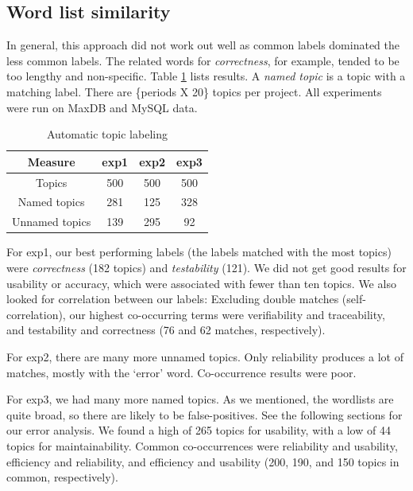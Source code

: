 \documentclass{acm_proc_article-sp}
\newcommand{\XXX}[1]{\textcolor{red}{{\it \textbf{[XXX: #1]}}}}
\begin{document}
\subsection{Word list similarity}


In general, this approach did not work out well as common labels dominated the less common labels. The related words for \emph{correctness}, for example, tended to be too lengthy and non-specific. Table \ref{tbl:wordlist} lists results. A \emph{named   topic} is a topic with a matching label. There are \{periods X 20\} topics per project. All experiments were run on MaxDB and MySQL data.



\begin{table}
	\caption{Automatic topic labeling}
	\centering
	\label{tbl:wordlist}
\begin{tabular}{c|c|c|c}
\toprule
Measure &		 \textsf{exp1} &	 \textsf{exp2} &	 \textsf{exp3} \\
\midrule
Topics &			500		 &			500  	 & 		500  \\
Named topics &		281      &			125      &		328  \\
Unnamed topics &	139      &			295      &      92   \\
\bottomrule
\end{tabular}
\end{table}


For \textsf{exp1}, our best performing labels (the labels matched with the most topics) were \emph{correctness} (182 topics) and \emph{testability} (121). We did not get good results for usability or accuracy, which were associated with fewer than ten topics. We also looked for correlation between our labels: Excluding double matches (self-correlation), our highest co-occurring terms were verifiability and traceability, and testability and correctness (76 and 62 matches, respectively).

For \textsf{exp2}, there are many more unnamed topics. Only reliability produces a lot of matches, mostly with the `error' word. Co-occurrence results were poor.

For \textsf{exp3}, we had many more named topics. As we mentioned, the wordlists are quite broad, so there are likely to be false-positives. See the following sections for our error analysis. We found a high of 265 topics for usability, with a low of 44 topics for maintainability. Common co-occurrences were reliability and usability, efficiency and reliability, and efficiency and usability (200, 190, and 150 topics in common, respectively). 
\end{document}
